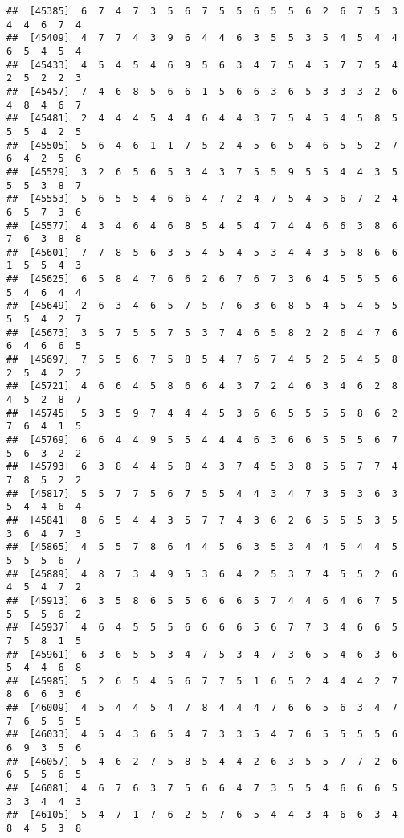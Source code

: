 \documentclass[
]{book}
\begin{document}
\begin{verbatim}
##  [45385]  6  7  4  7  3  5  6  7  5  5  6  5  5  6  2  6  7  5  3  4  4  6  7  4
##  [45409]  4  7  7  4  3  9  6  4  4  6  3  5  5  3  5  4  5  4  4  6  5  4  5  4
##  [45433]  4  5  4  5  4  6  9  5  6  3  4  7  5  4  5  7  7  5  4  2  5  2  2  3
##  [45457]  7  4  6  8  5  6  6  1  5  6  6  3  6  5  3  3  3  2  6  4  8  4  6  7
##  [45481]  2  4  4  4  5  4  4  6  4  4  3  7  5  4  5  4  5  8  5  5  5  4  2  5
##  [45505]  5  6  4  6  1  1  7  5  2  4  5  6  5  4  6  5  5  2  7  6  4  2  5  6
##  [45529]  3  2  6  5  6  5  3  4  3  7  5  5  9  5  5  4  4  3  5  5  5  3  8  7
##  [45553]  5  6  5  5  4  6  6  4  7  2  4  7  5  4  5  6  7  2  4  6  5  7  3  6
##  [45577]  4  3  4  6  4  6  8  5  4  5  4  7  4  4  6  6  3  8  6  7  6  3  8  8
##  [45601]  7  7  8  5  6  3  5  4  5  4  5  3  4  4  3  5  8  6  6  1  5  5  4  3
##  [45625]  6  5  8  4  7  6  6  2  6  7  6  7  3  6  4  5  5  5  6  5  4  6  4  4
##  [45649]  2  6  3  4  6  5  7  5  7  6  3  6  8  5  4  5  4  5  5  5  5  4  2  7
##  [45673]  3  5  7  5  5  7  5  3  7  4  6  5  8  2  2  6  4  7  6  6  4  6  6  5
##  [45697]  7  5  5  6  7  5  8  5  4  7  6  7  4  5  2  5  4  5  8  2  5  4  2  2
##  [45721]  4  6  6  4  5  8  6  6  4  3  7  2  4  6  3  4  6  2  8  4  5  2  8  7
##  [45745]  5  3  5  9  7  4  4  4  5  3  6  6  5  5  5  5  8  6  2  7  6  4  1  5
##  [45769]  6  6  4  4  9  5  5  4  4  4  6  3  6  6  5  5  5  6  7  5  6  3  2  2
##  [45793]  6  3  8  4  4  5  8  4  3  7  4  5  3  8  5  5  7  7  4  7  8  5  2  2
##  [45817]  5  5  7  7  5  6  7  5  5  4  4  3  4  7  3  5  3  6  3  5  4  4  6  4
##  [45841]  8  6  5  4  4  3  5  7  7  4  3  6  2  6  5  5  5  3  5  3  6  4  7  3
##  [45865]  4  5  5  7  8  6  4  4  5  6  3  5  3  4  4  5  4  4  5  5  5  5  6  7
##  [45889]  4  8  7  3  4  9  5  3  6  4  2  5  3  7  4  5  5  2  6  4  5  4  7  2
##  [45913]  6  3  5  8  6  5  5  6  6  6  5  7  4  4  6  4  6  7  5  5  5  5  6  2
##  [45937]  4  6  4  5  5  5  6  6  6  6  5  6  7  7  3  4  6  6  5  7  5  8  1  5
##  [45961]  6  3  6  5  5  3  4  7  5  3  4  7  3  6  5  4  6  3  6  5  4  4  6  8
##  [45985]  5  2  6  5  4  5  6  7  7  5  1  6  5  2  4  4  4  2  7  8  6  6  3  6
##  [46009]  4  5  4  4  5  4  7  8  4  4  4  7  6  6  5  6  3  4  7  7  6  5  5  5
##  [46033]  4  5  4  3  6  5  4  7  3  3  5  4  7  6  5  5  5  5  6  6  9  3  5  6
##  [46057]  5  4  6  2  7  5  8  5  4  4  2  6  3  5  5  7  7  2  6  6  5  5  6  5
##  [46081]  4  6  7  6  3  7  5  6  6  4  7  3  5  5  4  6  6  6  5  3  3  4  4  3
##  [46105]  5  4  7  1  7  6  2  5  7  6  5  4  4  3  4  6  6  3  4  8  4  5  3  8

\end{verbatim}
\end{document}
